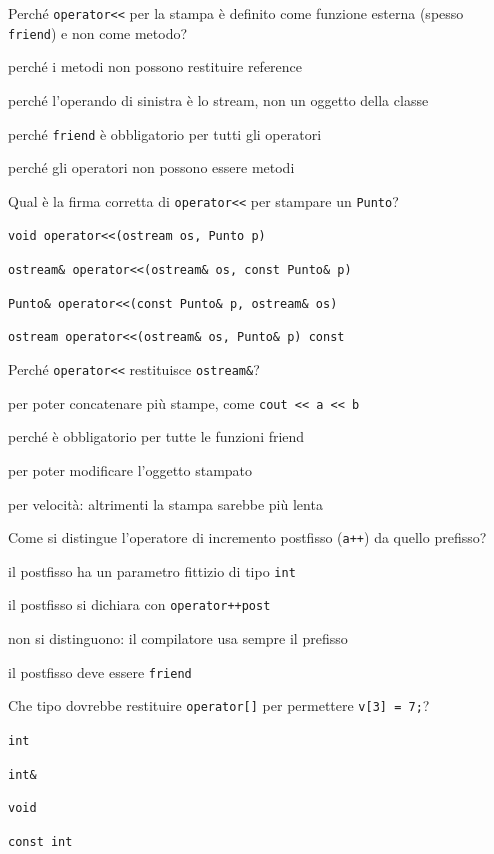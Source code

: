 \begin{quiz}{Perché \texttt{operator<<} per la stampa è definito come funzione esterna (spesso \texttt{friend}) e non come metodo?}
  \item perché i metodi non possono restituire reference
  \item perché l'operando di sinistra è lo stream, non un oggetto della classe
  \item perché \texttt{friend} è obbligatorio per tutti gli operatori
  \item perché gli operatori non possono essere metodi
\end{quiz}

\begin{quiz}{Qual è la firma corretta di \texttt{operator<<} per stampare un \texttt{Punto}?}
  \item \texttt{void operator<<(ostream os, Punto p)}
  \item \texttt{ostream\& operator<<(ostream\& os, const Punto\& p)}
  \item \texttt{Punto\& operator<<(const Punto\& p, ostream\& os)}
  \item \texttt{ostream operator<<(ostream\& os, Punto\& p) const}
\end{quiz}

\begin{quiz}{Perché \texttt{operator<<} restituisce \texttt{ostream\&}?}
  \item per poter concatenare più stampe, come \texttt{cout << a << b}
  \item perché è obbligatorio per tutte le funzioni friend
  \item per poter modificare l'oggetto stampato
  \item per velocità: altrimenti la stampa sarebbe più lenta
\end{quiz}

\begin{quiz}{Come si distingue l'operatore di incremento postfisso (\texttt{a++}) da quello prefisso?}
  \item il postfisso ha un parametro fittizio di tipo \texttt{int}
  \item il postfisso si dichiara con \texttt{operator++post}
  \item non si distinguono: il compilatore usa sempre il prefisso
  \item il postfisso deve essere \texttt{friend}
\end{quiz}

\begin{quiz}{Che tipo dovrebbe restituire \texttt{operator[]} per permettere \texttt{v[3] = 7;}?}
  \item \texttt{int}
  \item \texttt{int\&}
  \item \texttt{void}
  \item \texttt{const int}
\end{quiz}

